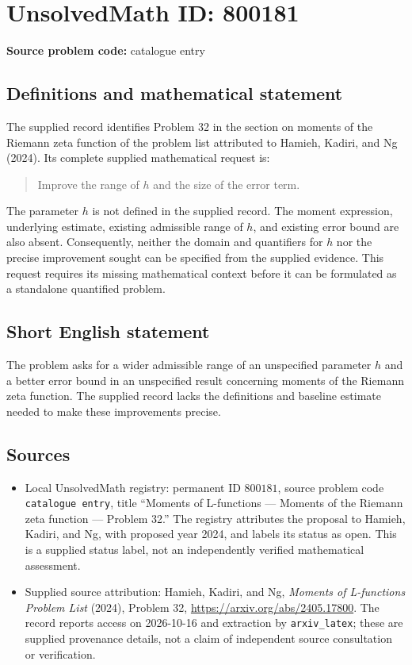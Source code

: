 \documentclass[11pt]{article}
\begin{document}
\section*{UnsolvedMath ID: 800181}
\textbf{Source problem code:} catalogue entry
\subsection{Definitions and mathematical statement}
The supplied record identifies Problem 32 in the section on moments of the Riemann zeta function of the problem list attributed to Hamieh, Kadiri, and Ng (2024). Its complete supplied mathematical request is:
\begin{quote}
Improve the range of $h$ and the size of the error term.
\end{quote}
The parameter $h$ is not defined in the supplied record. The moment expression, underlying estimate, existing admissible range of $h$, and existing error bound are also absent. Consequently, neither the domain and quantifiers for $h$ nor the precise improvement sought can be specified from the supplied evidence. This request requires its missing mathematical context before it can be formulated as a standalone quantified problem.
\subsection{Short English statement}
The problem asks for a wider admissible range of an unspecified parameter $h$ and a better error bound in an unspecified result concerning moments of the Riemann zeta function. The supplied record lacks the definitions and baseline estimate needed to make these improvements precise.
\subsection{Sources}
\begin{itemize}
\item Local UnsolvedMath registry: permanent ID \(800181\), source problem code \texttt{catalogue entry}, title ``Moments of L-functions --- Moments of the Riemann zeta function --- Problem 32.'' The registry attributes the proposal to Hamieh, Kadiri, and Ng, with proposed year 2024, and labels its status as open. This is a supplied status label, not an independently verified mathematical assessment.
\item Supplied source attribution: Hamieh, Kadiri, and Ng, \emph{Moments of L-functions Problem List} (2024), Problem 32, \url{https://arxiv.org/abs/2405.17800}. The record reports access on 2026-10-16 and extraction by \texttt{arxiv\_latex}; these are supplied provenance details, not a claim of independent source consultation or verification.
\end{itemize}
\end{document}
